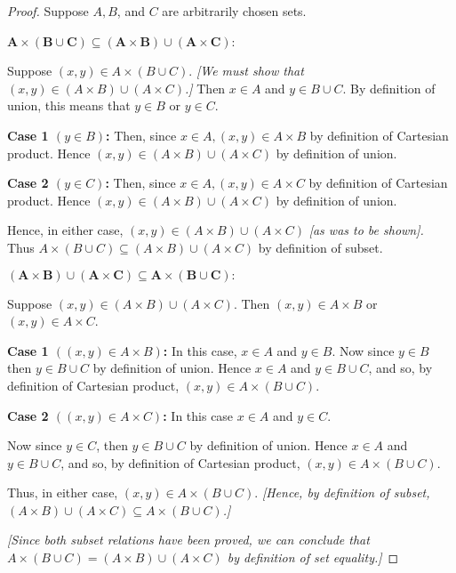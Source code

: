 \documentclass[14pt]{extarticle}
\begin{document}
\begin{proof}
  Suppose $A, B$, and $C$ are arbitrarily chosen sets.

  \(\bm{A \times (B \cup C) \subseteq (A \times B) \cup (A \times C)}\):

  Suppose \((x, y) \in A \times (B \cup C)\). {\it [We must show that \((x, y) \in (A \times B) \cup (A \times C)\).]}
  Then \(x \in A\) and \(y \in B \cup C\). By definition of union, this means that \(y \in B\) or \(y \in C\).

    {\bf Case 1 \((y \in B)\):} Then, since \(x \in A, (x, y) \in A \times B\) by definition of Cartesian product. Hence
  \((x, y) \in (A \times B) \cup (A \times C)\) by definition of union.

    {\bf Case 2 \((y \in C)\):} Then, since \(x \in A, (x, y) \in A \times C\) by definition of Cartesian product. Hence
  \((x, y) \in (A \times B) \cup (A \times C)\) by definition of union.

  Hence, in either case, \((x, y) \in (A \times B) \cup (A \times C)\) {\it [as was to be shown].} Thus
  \(A \times (B \cup C) \subseteq (A \times B) \cup (A \times C)\) by definition of subset.

  \(\bm{(A \times B) \cup (A \times C) \subseteq A \times (B \cup C):}\)

  Suppose \((x, y) \in (A \times B) \cup (A \times C)\). Then \((x, y) \in A \times B\) or \((x, y) \in A \times C\).

    {\bf Case 1 \(((x, y) \in A \times B)\):} In this case, \(x \in A\) and \(y \in B\). Now since \(y \in B\) then
  \(y \in B \cup C\) by definition of union. Hence \(x \in A\) and \(y \in B \cup C\), and so, by definition of
  Cartesian product, \((x, y) \in A \times (B \cup C)\).

    {\bf Case 2 \(((x, y) \in A \times C)\):} In this case \(x \in A\) and \(y \in C\).

  Now since \(y \in C\), then \(y \in B \cup C\) by definition of union. Hence \(x \in A\) and \(y \in B \cup C\),
  and so, by definition of Cartesian product, \((x, y) \in A \times (B \cup C)\).

  Thus, in either case, \((x, y) \in A \times (B \cup C)\). {\it [Hence, by definition of subset, \((A \times B) \cup (A \times C ) \subseteq A \times (B \cup C)\).]}

    {\it [Since both subset relations have been proved, we can conclude that \(A \times (B \cup C) = (A \times B) \cup
        (A \times C)\) by definition of set equality.]}
\end{proof}
\end{document}
